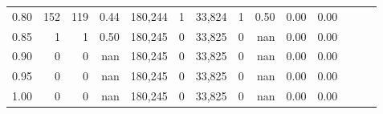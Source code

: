 \begin{tabular}{rrrrrrrrrrrrrr}
0.80 &     152 &    119 &  0.44 &  180,244 &        1 &  33,824 &       1 &  0.50 &  0.00 &      0.00 \\
0.85 &       1 &      1 &  0.50 &  180,245 &        0 &  33,825 &       0 &   nan &  0.00 &      0.00 \\
0.90 &       0 &      0 &   nan &  180,245 &        0 &  33,825 &       0 &   nan &  0.00 &      0.00 \\
0.95 &       0 &      0 &   nan &  180,245 &        0 &  33,825 &       0 &   nan &  0.00 &      0.00 \\
1.00 &       0 &      0 &   nan &  180,245 &        0 &  33,825 &       0 &   nan &  0.00 &      0.00 \\
\bottomrule
\end{tabular}
